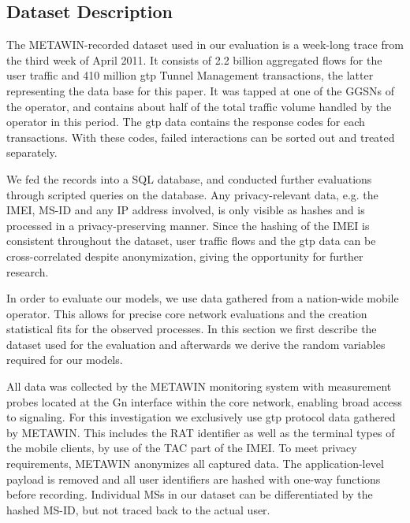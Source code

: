 \subsection{Dataset Description}


The \gls{METAWIN}-recorded dataset used in our evaluation is a week-long trace from the third week of April 2011. It consists of 2.2 billion aggregated flows for the user traffic and 410 million \gls{gtp} Tunnel Management transactions, the latter representing the data base for this paper. It was tapped at one of the \glspl{GGSN} of the operator, and contains about half of the total traffic volume handled by the operator in this period. The \gls{gtp} data contains the response codes for each transactions. With these codes, failed interactions can be sorted out and treated separately.

We fed the records into a SQL database, and conducted further evaluations through scripted queries on the database. Any privacy-relevant data, e.g. the \gls{IMEI}, \gls{MS-ID} and any IP address involved, is only visible as hashes and is processed in a privacy-preserving manner.  Since the hashing of the \gls{IMEI} is consistent throughout the dataset, user traffic flows and the \gls{gtp} data can be cross-correlated despite anonymization, giving the opportunity for further research.


In order to evaluate our models, we use data gathered from a nation-wide mobile operator. This allows for precise core network evaluations and the creation statistical fits for the observed processes.
In this section we first describe the dataset used for the evaluation and afterwards we derive the random variables required for our models.

All data was collected by the \gls{METAWIN} monitoring system \cite{ricciato_2011} with measurement probes located at the Gn interface within the core network, enabling broad access to signaling. For this investigation we exclusively use \gls{gtp} protocol data gathered by \gls{METAWIN}. This includes the \gls{RAT} identifier as well as the terminal types of the mobile clients, by use of the \gls{TAC} part of the \gls{IMEI}. %
To meet privacy requirements, \gls{METAWIN} anonymizes all captured data. The application-level payload is removed and all user identifiers are hashed with one-way functions before recording. Individual \glspl{MS} in our dataset can be differentiated by the hashed \gls{MS-ID}, but not traced back to the actual user.

